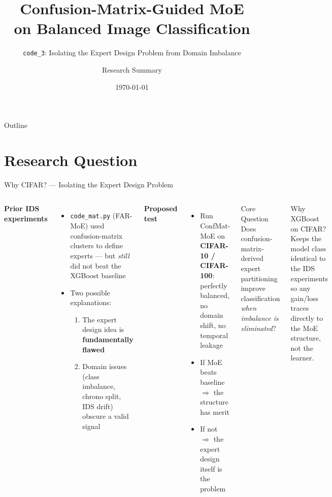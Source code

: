 \documentclass[aspectratio=169,10pt]{beamer}
\title[\texttt{code\_3}: ConfMat-MoE on CIFAR]%
      {Confusion-Matrix-Guided MoE\\on Balanced Image Classification}
\subtitle{\texttt{code\_3}: Isolating the Expert Design Problem from Domain Imbalance}
\author{Research Summary}
\institute{Network Security \& Class Imbalance Project}
\date{\today}
\begin{document}

\begin{frame}
  \titlepage
\end{frame}

\begin{frame}{Outline}
  \tableofcontents
\end{frame}

\section{Research Question}

\begin{frame}{Why CIFAR? --- Isolating the Expert Design Problem}
  \begin{columns}[T]
      \textbf{Prior IDS experiments}
      \begin{itemize}\itemsep3pt
        \item \texttt{code\_mat.py} (FAR-MoE) used confusion-matrix clusters
              to define experts --- but \emph{still} did not beat the XGBoost baseline
        \item Two possible explanations:
          \begin{enumerate}
            \item The expert design idea is \textbf{fundamentally flawed}
            \item Domain issues (class imbalance, chrono split, IDS drift) obscure a valid signal
          \end{enumerate}
      \end{itemize}
      \vspace{6pt}
      \textbf{Proposed test}
      \begin{itemize}\itemsep3pt
        \item Run ConfMat-MoE on \textbf{CIFAR-10 / CIFAR-100}:
              perfectly balanced, no domain shift, no temporal leakage
        \item If MoE beats baseline $\Rightarrow$ the structure has merit
        \item If not $\Rightarrow$ the expert design itself is the problem
      \end{itemize}
      \begin{alertblock}{Core Question}
        Does confusion-matrix-derived expert partitioning improve
        classification \emph{when imbalance is eliminated}?
      \end{alertblock}
      \vspace{8pt}
      \begin{block}{Why XGBoost on CIFAR?}
        \footnotesize
        Keeps the model class identical to the IDS experiments so any
        gain/loss traces directly to the MoE structure, not the learner.
      \end{block}
  \end{columns}
\end{frame}
\end{document}
